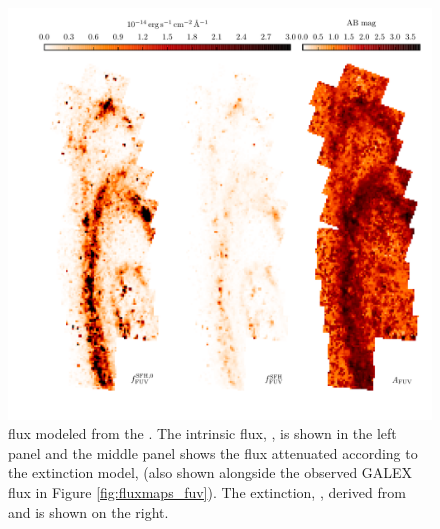 \documentclass[iop, tighten]{emulateapj}
\begin{document}
\begin{figure}
\centering
\includegraphics[width=\textwidth]{m31flux-figures/modfluxmaps_fuv.pdf}
\caption[\fuv{} flux map modeled from the .]{\fuv{} flux modeled from
    the . The intrinsic flux, \ffuvsfhz{}, is shown in the left panel
    and the middle panel shows the flux attenuated according to the extinction
    model, \ffuvsfh{} (also shown alongside the observed GALEX \fuv{} flux in
    Figure \ref{fig:fluxmaps_fuv}). The \fuv{} extinction, \afuv{}, derived
    from \ffuvsfhz{} and \ffuvsfh{} is shown on the right.
}
\label{fig:modfluxmaps_fuv}
\end{figure}
\end{document}
